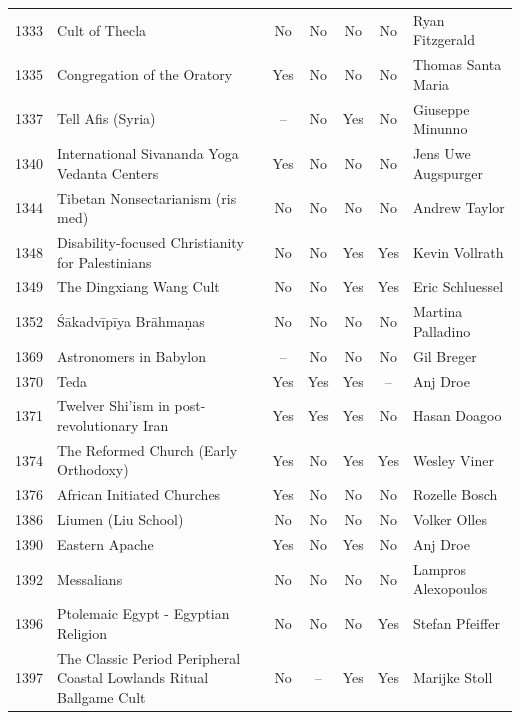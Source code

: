 {\begin{longtable}{rp{3.5cm}ccccp{3cm}}
1333 & {\raggedright Cult of Thecla} & No & No & No & No & {\raggedright Ryan Fitzgerald} \\
1335 & {\raggedright Congregation of the Oratory} & Yes & No & No & No & {\raggedright Thomas Santa Maria} \\
1337 & {\raggedright Tell Afis (Syria)} & -- & No & Yes & No & {\raggedright Giuseppe Minunno} \\
1340 & {\raggedright International Sivananda Yoga Vedanta Centers} & Yes & No & No & No & {\raggedright Jens Uwe Augspurger} \\
1344 & {\raggedright Tibetan Nonsectarianism (ris med)} & No & No & No & No & {\raggedright Andrew Taylor} \\
1348 & {\raggedright Disability-focused Christianity for Palestinians} & No & No & Yes & Yes & {\raggedright Kevin Vollrath} \\
1349 & {\raggedright The Dingxiang Wang Cult} & No & No & Yes & Yes & {\raggedright Eric Schluessel} \\
1352 & {\raggedright Śākadvīpīya Brāhmaṇas} & No & No & No & No & {\raggedright Martina Palladino} \\
1369 & {\raggedright Astronomers in Babylon} & -- & No & No & No & {\raggedright Gil Breger} \\
1370 & {\raggedright Teda} & Yes & Yes & Yes & -- & {\raggedright Anj Droe} \\
1371 & {\raggedright Twelver Shi'ism in post-revolutionary Iran} & Yes & Yes & Yes & No & {\raggedright Hasan Doagoo} \\
1374 & {\raggedright The Reformed Church (Early Orthodoxy)} & Yes & No & Yes & Yes & {\raggedright Wesley Viner} \\
1376 & {\raggedright African Initiated Churches} & Yes & No & No & No & {\raggedright Rozelle Bosch} \\
1386 & {\raggedright Liumen (Liu School)} & No & No & No & No & {\raggedright Volker Olles} \\
1390 & {\raggedright Eastern Apache} & Yes & No & Yes & No & {\raggedright Anj Droe} \\
1392 & {\raggedright Messalians} & No & No & No & No & {\raggedright Lampros Alexopoulos} \\
1396 & {\raggedright Ptolemaic Egypt - Egyptian Religion} & No & No & No & Yes & {\raggedright Stefan Pfeiffer} \\
1397 & {\raggedright The Classic Period Peripheral Coastal Lowlands Ritual Ballgame Cult} & No & -- & Yes & Yes & {\raggedright Marijke Stoll} \\

\end{longtable}}

